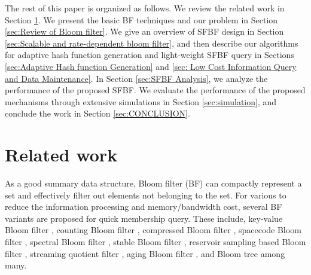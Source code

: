 \documentclass[10pt,journal,letterpaper]{IEEEtran}
\newcommand{\rev}[1]{\uwave{#1}}
\newcommand{\note}[1]{{\sffamily\itshape\bfseries\uline{#1}}}
\begin{document}
The rest of this paper is organized as follows. We review the related work in Section \ref{sec:RELATED_WORK}. We present the basic BF techniques and  our problem in Section \ref{sec:Review of Bloom filter}. We give an overview of SFBF design in Section \ref{sec:Scalable and rate-dependent bloom filter}, and then describe our algorithms for adaptive hash function generation and light-weight SFBF query in Sections \ref{sec:Adaptive Hash function Generation} and \ref{sec: Low Cost Information Query and Data Maintenance}. In Section \ref{sec:SFBF Analysis}, we analyze the performance of the proposed SFBF. We evaluate the performance of the proposed mechanisms through extensive simulations in Section \ref{sec:simulation}, and conclude the work in Section \ref{sec:CONCLUSION}.



\section{Related work}
\label{sec:RELATED_WORK}

As a good summary data structure, Bloom filter (BF) can compactly represent a set and effectively filter out elements not belonging to the set. For various \rev{applications} to reduce the information processing and memory/bandwidth cost, several BF variants are proposed for quick membership query.
These include, key-value Bloom filter \cite{6848046}, counting Bloom filter \cite{fan2000summary}, compressed Bloom filter \cite{mitzenmacher2002compressed}, spacecode Bloom filter \cite{kumar2006space}, spectral Bloom filter \cite{cohen2003spectral}, stable Bloom filter \cite{deng2006approximately}, reservoir sampling based Bloom filter \cite{dutta2012towards},  streaming quotient filter \cite{dutta2013streaming}, aging Bloom filter \cite{yoon2010aging}, and Bloom tree \cite{tree6848077} among many.
\end{document}
